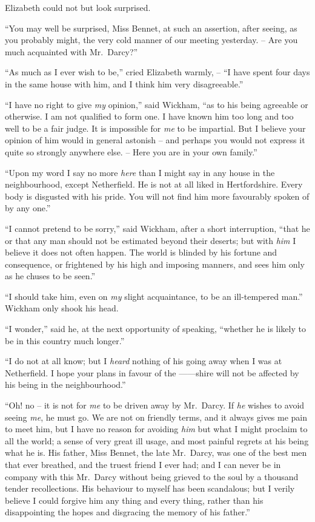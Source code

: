 Elizabeth could not but look surprised.

“You may well be surprised, Miss Bennet, at such an
assertion, after seeing, as you probably might, the very
cold manner of our meeting yesterday. -- Are you much
acquainted with Mr.\ Darcy?”

“As much as I ever wish to be,” cried Elizabeth
warmly, -- “I have spent four days in the same house
with him, and I think him very disagreeable.”

“I have no right to give \textit{my} opinion,” said Wickham,
“as to his being agreeable or otherwise. I am not qualified
to form one. I have known him too long and too well to
be a fair judge. It is impossible for \textit{me} to be impartial.
But I believe your opinion of him would in general
astonish -- and perhaps you would not express it quite so
strongly anywhere else. -- Here you are in your own family.”

“Upon my word I say no more \textit{here} than I might say
in any house in the neighbourhood, except Netherfield.
He is not at all liked in Hertfordshire. Every body is
disgusted with his pride. You will not find him more
favourably spoken of by any one.”

“I cannot pretend to be sorry,” said Wickham, after
a short interruption, “that he or that any man should
not be estimated beyond their deserts; but with \textit{him}
I believe it does not often happen. The world is blinded
by his fortune and consequence, or frightened by his high
and imposing manners, and sees him only as he chuses to
be seen.”

“I should take him, even on \textit{my} slight acquaintance,
to be an ill-tempered man.” Wickham only shook his
head.

“I wonder,” said he, at the next opportunity of
speaking, “whether he is likely to be in this country much
longer.”

“I do not at all know; but I \textit{heard} nothing of his going
away when I was at Netherfield. I hope your plans in
favour of the \hbox{------shire} will not be affected by his being
in the neighbourhood.”

“Oh! no -- it is not for \textit{me} to be driven away by
Mr.\ Darcy. If \textit{he} wishes to avoid seeing \textit{me}, he must go.
We are not on friendly terms, and it always gives me pain
to meet him, but I have no reason for avoiding \textit{him}
but what I might proclaim to all the world; a sense of
very great ill usage, and most painful regrets at his being
what he is. His father, Miss Bennet, the late Mr.\ Darcy,
was one of the best men that ever breathed, and the truest
friend I ever had; and I can never be in company with
this Mr.\ Darcy without being grieved to the soul by a
thousand tender recollections. His behaviour to myself
has been scandalous; but I verily believe I could forgive
him any thing and every thing, rather than his disappointing
the hopes and disgracing the memory of his father.”

